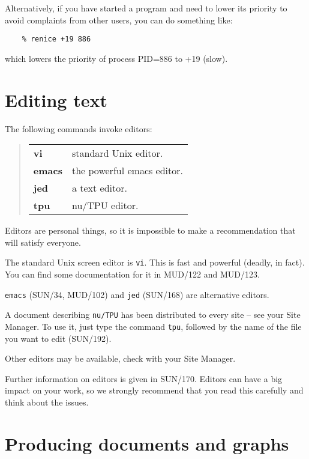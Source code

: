 \documentclass[twoside,11pt]{article}
\newcommand{\xref}[3]{#1}
\begin{document}
Alternatively, if you have started a program and need to lower its priority
to avoid complaints from other users, you can do something like:
\begin{verbatim}
    % renice +19 886
\end{verbatim}
which lowers the priority of process PID=886 to +19 (slow).

\newpage

\section{Editing text}

The following commands invoke editors:
\begin{quote}
\begin{tabular}{lp{67mm}}

{\bf vi}    & standard Unix editor.\\
{\bf emacs} & the powerful emacs editor.\\
{\bf jed}   & a text editor.\\
{\bf tpu}   & nu/TPU editor.

\end{tabular}
\end{quote}
Editors are personal things, so it is impossible to make a recommendation
that will satisfy everyone.

The standard Unix screen editor is {\tt vi}.
This is fast and powerful (deadly, in fact).
You can find some documentation for it in MUD/122 and MUD/123.

{\tt emacs}
(\xref{SUN/34}{sun34}{}, MUD/102) and {\tt jed}
(\xref{SUN/168}{sun168}{}) are alternative editors.

A document describing {\tt nu/TPU} has been distributed to every site --
see your Site Manager. To use it, just type the command {\tt tpu},
followed by the name of the file you want to edit
(\xref{SUN/192}{sun192}{}).

Other editors may be available, check with your Site Manager.

Further information on editors is given in
\xref{SUN/170}{sun170}{}.
Editors can have a big impact on your work, so we strongly recommend that you
read this carefully and think about the issues.

\newpage

\section{Producing documents and graphs}
\end{document}
